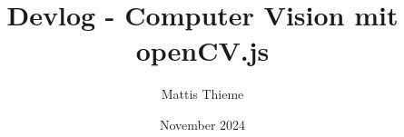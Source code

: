\documentclass{article}
\title{Devlog - Computer Vision mit openCV.js}
\author{Mattis Thieme}
\date{November 2024}
\begin{document}
\maketitle \newpage

\renewcommand*\contentsname{Inhaltsverzeichnis} %
\tableofcontents \newpage

 \newpage

 \newpage

 \newpage

 \newpage

 \newpage

 \newpage

 \newpage

 \newpage

 \newpage
\end{document}
